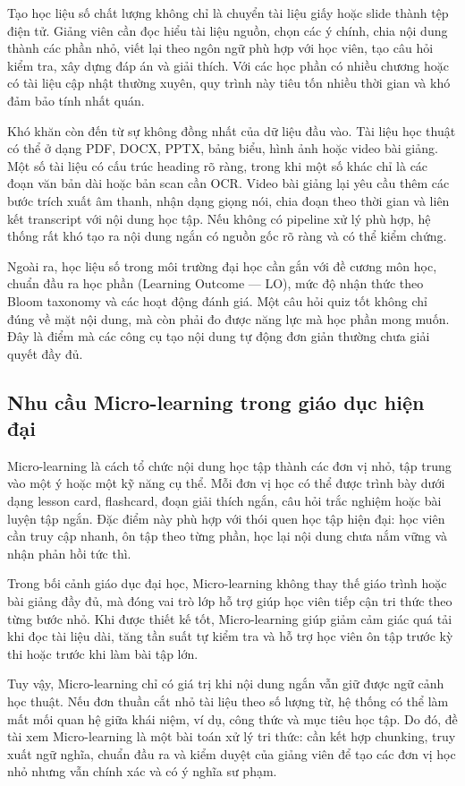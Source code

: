 Tạo học liệu số chất lượng không chỉ là chuyển tài liệu giấy hoặc slide thành
tệp điện tử. Giảng viên cần đọc hiểu tài liệu nguồn, chọn các ý chính, chia
nội dung thành các phần nhỏ, viết lại theo ngôn ngữ phù hợp với học viên, tạo
câu hỏi kiểm tra, xây dựng đáp án và giải thích. Với các học phần có nhiều
chương hoặc có tài liệu cập nhật thường xuyên, quy trình này tiêu tốn nhiều
thời gian và khó đảm bảo tính nhất quán.

Khó khăn còn đến từ sự không đồng nhất của dữ liệu đầu vào. Tài liệu học thuật
có thể ở dạng PDF, DOCX, PPTX, bảng biểu, hình ảnh hoặc video bài giảng. Một
số tài liệu có cấu trúc heading rõ ràng, trong khi một số khác chỉ là các đoạn
văn bản dài hoặc bản scan cần OCR. Video bài giảng lại yêu cầu thêm các bước
trích xuất âm thanh, nhận dạng giọng nói, chia đoạn theo thời gian và liên kết
transcript với nội dung học tập. Nếu không có pipeline xử lý phù hợp, hệ thống
rất khó tạo ra nội dung ngắn có nguồn gốc rõ ràng và có thể kiểm chứng.

Ngoài ra, học liệu số trong môi trường đại học cần gắn với đề cương môn học,
chuẩn đầu ra học phần (Learning Outcome --- LO), mức độ nhận thức theo Bloom
taxonomy và các hoạt động đánh giá. Một câu hỏi quiz tốt không chỉ đúng về mặt
nội dung, mà còn phải đo được năng lực mà học phần mong muốn. Đây là điểm mà
các công cụ tạo nội dung tự động đơn giản thường chưa giải quyết đầy đủ.

\subsection{Nhu cầu Micro-learning trong giáo dục hiện đại}

Micro-learning là cách tổ chức nội dung học tập thành các đơn vị nhỏ, tập
trung vào một ý hoặc một kỹ năng cụ thể. Mỗi đơn vị học có thể được trình bày
dưới dạng lesson card, flashcard, đoạn giải thích ngắn, câu hỏi trắc nghiệm
hoặc bài luyện tập ngắn. Đặc điểm này phù hợp với thói quen học tập hiện đại:
học viên cần truy cập nhanh, ôn tập theo từng phần, học lại nội dung chưa nắm
vững và nhận phản hồi tức thì.

Trong bối cảnh giáo dục đại học, Micro-learning không thay thế giáo trình hoặc
bài giảng đầy đủ, mà đóng vai trò lớp hỗ trợ giúp học viên tiếp cận tri thức
theo từng bước nhỏ. Khi được thiết kế tốt, Micro-learning giúp giảm cảm giác
quá tải khi đọc tài liệu dài, tăng tần suất tự kiểm tra và hỗ trợ học viên ôn
tập trước kỳ thi hoặc trước khi làm bài tập lớn.

Tuy vậy, Micro-learning chỉ có giá trị khi nội dung ngắn vẫn giữ được ngữ cảnh
học thuật. Nếu đơn thuần cắt nhỏ tài liệu theo số lượng từ, hệ thống có thể
làm mất mối quan hệ giữa khái niệm, ví dụ, công thức và mục tiêu học tập. Do
đó, đề tài xem Micro-learning là một bài toán xử lý tri thức: cần kết hợp
chunking, truy xuất ngữ nghĩa, chuẩn đầu ra và kiểm duyệt của giảng viên để
tạo các đơn vị học nhỏ nhưng vẫn chính xác và có ý nghĩa sư phạm.

